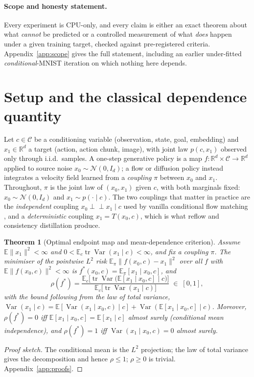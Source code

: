 \documentclass{article}
\theoremstyle{plain}
\newtheorem{theorem}{Theorem}
\newcommand{\Real}{\mathbb{R}}
\newcommand{\tr}{\operatorname{tr}}
\newcommand{\Var}{\operatorname{Var}}
\newcommand{\Eop}{\mathbb{E}}
\newcommand{\Ncal}{\mathcal{N}}
\newcommand{\indep}{\perp\!\!\!\perp}
\begin{document}
\paragraph{Scope and honesty statement.} Every experiment is CPU-only, and every claim is
either an exact theorem about what \emph{cannot} be predicted or a controlled measurement
of what \emph{does} happen under a given training target, checked against pre-registered
criteria. Appendix~\ref{app:scope} gives the full statement, including an earlier
under-fitted \emph{conditional}-MNIST iteration on which nothing here depends.

\section{Setup and the classical dependence quantity}
\label{sec:setup}

Let $c\in\mathcal C$ be a conditioning variable (observation, state, goal, embedding)
and $x_1\in\Real^d$ a target (action, action chunk, image), with joint law
$p(c,x_1)$ observed only through i.i.d.\ samples. A one-step generative policy is a
map $f:\Real^d\times\mathcal C\to\Real^d$ applied to source noise
$x_0\sim\Ncal(0,I_d)$; a flow or diffusion policy instead integrates a velocity field
learned from a \emph{coupling} $\pi$ between $x_0$ and $x_1$. Throughout, $\pi$ is the
joint law of $(x_0,x_1)$ given $c$, with both marginals fixed: $x_0\sim\Ncal(0,I_d)$
and $x_1\sim p(\cdot\mid c)$. The two couplings that matter in practice are the
\emph{independent} coupling $x_0\indep x_1\mid c$ used by vanilla conditional flow
matching \citep{lipman2023flowmatching,tong2024cfm}, and a \emph{deterministic}
coupling $x_1=T(x_0,c)$, which is what reflow \citep{liu2023rectifiedflow} and
consistency distillation produce.

\begin{theorem}[Optimal endpoint map and mean-dependence criterion]
\label{thm:optimal}
Assume $\Eop\|x_1\|^2<\infty$ and $0<\Eop_c\tr\Var(x_1\mid c)<\infty$, and fix a coupling
$\pi$. The minimiser of the pointwise $L^2$ risk $\Eop_\pi\|f(x_0,c)-x_1\|^2$ over all $f$
with $\Eop\|f(x_0,c)\|^2<\infty$ is
$f^\ast(x_0,c)=\Eop_\pi[x_1\mid x_0,c]$, and
\[
  \rho(f^\ast)=
  \frac{\Eop_c\big[\tr\Var\big(\Eop[x_1\mid x_0,c]\mid c\big)\big]}
       {\Eop_c\big[\tr\Var(x_1\mid c)\big]}\;\in\;[0,1],
\]
with the bound following from the law of total variance,
$\Var(x_1\mid c)=\Eop[\Var(x_1\mid x_0,c)\mid c]+\Var(\Eop[x_1\mid x_0,c]\mid c)$.
Moreover, $\rho(f^\ast)=0$ iff $\Eop[x_1\mid x_0,c]=\Eop[x_1\mid c]$ almost surely
(conditional mean independence), and $\rho(f^\ast)=1$ iff
$\Var(x_1\mid x_0,c)=0$ almost surely.
\end{theorem}
\begin{proof}[Proof sketch]
The conditional mean is the $L^2$ projection; the law of total variance gives the
decomposition and hence $\rho\le1$; $\rho\ge0$ is trivial. Appendix~\ref{app:proofs}.
\end{proof}
\end{document}
